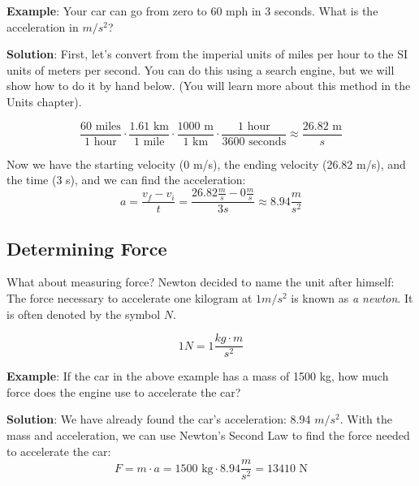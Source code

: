 \textbf{Example}: Your car can go from zero to 60 mph in 3 seconds. What is the
acceleration in $m / s^2$?

\textbf{Solution}: First, let's convert from the imperial units of miles per
hour to the SI units of meters per second. You can do this using a search engine, but we will show how to do it by hand below. (You will learn more about this method in the Units chapter).

$$\frac{60 \text{ miles}}{1 \text{ hour}} \cdot \frac{1.61 \text{ km}}{1 \text{ mile}} \cdot \frac{1000\text{ m}}{1\text{ km}} \cdot \frac{1\text{ hour}}{3600\text{ seconds}} \approx \frac{26.82\text{ m}}{s}$$

Now we have the starting velocity (0 m/s), the ending velocity (26.82 m/s), and the time (3 s), and we can find the acceleration:
$$a = \frac{v_f - v_i}{t} = \frac{26.82\frac{m}{s} - 0\frac{m}{s}}{3s} \approx 8.94 \frac{m}{s^2}$$

\subsection{Determining Force}
What about measuring force? Newton decided to name the unit after himself: The
force necessary to accelerate one kilogram at $1 m/s^2$ is known as \textit{a
newton}. It is often denoted by the symbol $N$.

$$1 N = 1 \frac{kg \cdot m}{s^2}$$

\textbf{Example}: If the car in the above example has a mass of 1500 kg, how much force does the engine use to accelerate the car?

\textbf{Solution}: We have already found the car's acceleration: 8.94 $m/s^2$. With the mass and acceleration, we can use Newton's Second Law to find the force needed to accelerate the car:
$$F = m \cdot a = 1500\text{ kg} \cdot 8.94 \frac{m}{s^2} = 13410\text{ N}$$

